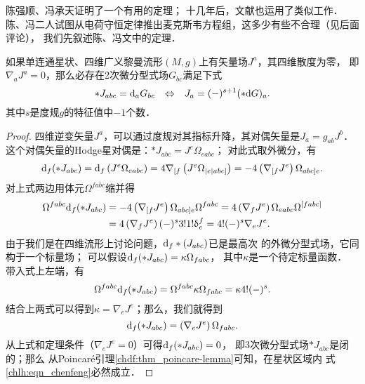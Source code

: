 陈强顺、冯承天\cite{chen-feng1989-cn,chen-yu1993-en}证明了一个有用的定理；
十几年后，文献\parencite{hehl-Obukhov-2003}也运用了类似工作．
陈、冯二人试图从电荷守恒定律推出麦克斯韦方程组，这多少有些不合理（见后面评论），
我们先叙述陈、冯文中的定理．
\begin{theorem}\label{chlh:thm_chenfeng}
    如果单连通星状、四维广义黎曼流形$(M,g)$上有矢量场$J^a$，其四维散度为零，
    即$\nabla_a J^a=0$，那么必存在2次微分型式场$G_{bc}$满足下式
    \begin{equation}\label{chlh:eqn_chenfeng}
        *J_{abc} = {\rm d}_a G_{bc}  {\quad  \Leftrightarrow \quad} J_a = (-)^{s+1} ( *{\rm d}G  )_a .
    \end{equation}
    其中$s$是度规$g$的特征值中$-1$个数．
\end{theorem}
\begin{proof}
    四维逆变矢量$J^a$，可以通过度规对其指标升降，其对偶矢量是${J_a} = {g_{ab}}{J^b}$．
    这个对偶矢量的Hodge星对偶是：$*J_{abc} = {J^e}\Omega _{eabc}$；
    对此式取外微分，有
    \begin{equation}
        {\rm d}_f(*{J_{abc}}) = {{\text{d}}_f}\left( {{J^e}{\Omega _{eabc}}} \right)
        = 4{\nabla _{[f}}\left( {{J^e}{\Omega _{|e|abc]}}} \right)
        = -4\left( {{\nabla _{[f}}{J^e}} \right){\Omega _{abc]e}} .
    \end{equation}
    对上式两边用体元${\Omega ^{fabc}}$缩并得
    \begin{align*}
        {\Omega ^{fabc}}{\rm d}_f (*{J_{abc}}) &=- 4\left( {{\nabla _{[f}}{J^e}} \right)
        {\Omega _{abc]e}}{\Omega ^{fabc}} = 4\left( {{\nabla _f}{J^e}} \right)
        {\Omega _{eabc}}{\Omega ^{[fabc]}} \\
        &= 4\left( {{\nabla _f}{J^e}} \right){(-)^s}
        3!1!\updelta _e^f = 4!{(- )^s}{\nabla _e}{J^e} .
    \end{align*}
    由于我们是在四维流形上讨论问题，${\rm d}_f*({J_{abc}})$已是最高次
    的外微分型式场，它同构于一个标量场；
    可以假设${\rm d}_f (*{J_{abc}}) = \kappa {\Omega _{fabc}}$，
    其中$\kappa$是一个待定标量函数． 带入式上左端，有
    \begin{equation}
        {\Omega ^{fabc}}{\rm d}_f (*{J_{abc}}) = {\Omega ^{fabc}}\kappa
        {\Omega _{fabc}} = \kappa 4!{(-)^s} .
    \end{equation}
    结合上两式可以得到$\kappa  = {\nabla _e}{J^e}$；那么，我们就得到
    \begin{equation}\label{chlh:eqn_dJ=nJO}
        {\rm d}_f (*{J_{abc}}) = \left( {{\nabla _e}{J^e}} \right){\Omega _{fabc}} .
    \end{equation}
    从上式和定理条件（$\nabla_e J^e=0$）可得${\rm d}_f (*{J_{abc}}) = 0$，
    即3次微分型式场$*{J_{abc}}$是闭的；那么
    从Poincar\'e引理\ref{chdf:thm_poincare-lemma}可知，在星状区域内
    式\eqref{chlh:eqn_chenfeng}必然成立．
\end{proof}


